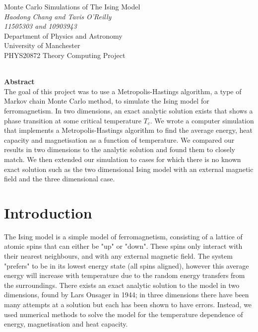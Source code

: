 \documentclass[11pt]{article}
\begin{document}
	
	\begin{titlepage}
		\begin{center}
			{\Huge Monte Carlo Simulations of The Ising Model}\\[0.5cm]
			\textit{Haodong Chang and Tavis O'Reilly}\\[0.3cm]
			\textit{11505303 and 10903943}\\[0.3cm]
			Department of Physics and Astronomy\\[0.3cm]
			University of Manchester\\[0.3cm]
			PHYS20872 Theory Computing Project\\[0.3cm]
			\shortmonthname[\the\month]  \the\year \\[4cm]
			
		\end{center}
		
		{\Large \textbf{Abstract}}\\[0.3cm]
		The goal of this project was to use a Metropolis-Hastings algorithm, a type of Markov chain Monte Carlo method, to simulate the Ising model for ferromagnetism. In two dimensions, an exact analytic solution exists\cite{onsager_solution} that shows a phase transition at some critical temperature $T_c$. We wrote a computer simulation that implements a Metropolis-Hastings algorithm to find the average energy, heat capacity and magnetisation as a function of temperature. We compared our results in two dimensions to the analytic solution and found them to closely match. We then extended our simulation to cases for which there is no known exact solution such as the two dimensional Ising model with an external magnetic field and the three dimensional case.
	\end{titlepage}
	
	\clearpage
	\setcounter{page}{2}
	
	\newpage
	
	\section{Introduction}
	
	The Ising model is a simple model of ferromagnetism, consisting of a lattice of atomic spins that can either be "up" or "down". These spins only interact with their nearest neighbours, and with any external magnetic field. The system "prefers" to be in its lowest energy state (all spins aligned), however this average energy will increase with temperature due to the random energy transfers from the surroundings. There exists an exact analytic solution to the model in two dimensions\cite{onsager_solution}, found by Lars Onsager in 1944; in three dimensions there have been many attempts at a solution\cite{das1970exact}\cite{lou2000three}\cite{zhang2007conjectures}\cite{zhang2021exact} but each has been shown to have errors. Instead, we used numerical methods to solve the model for the temperature dependence of energy, magnetisation and heat capacity.
	
\end{document}
